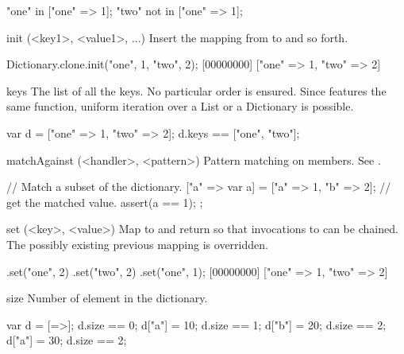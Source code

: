 \begin{urbiscriptapi}
\begin{urbiassert}
"one" in     ["one" => 1];
"two" not in ["one" => 1];
\end{urbiassert}


\item[init](<key1>, <value1>, ...)%
  Insert the mapping from  to  and so forth.

\begin{urbiscript}
Dictionary.clone.init("one", 1, "two", 2);
[00000000] ["one" => 1, "two" => 2]
\end{urbiscript}


\item[keys]%
  The list of all the keys.  No particular order is ensured.  Since
   features the same function, uniform iteration over
  a List or a Dictionary is possible.
\begin{urbiassert}
var d = ["one" => 1, "two" => 2];
d.keys == ["one", "two"];
\end{urbiassert}


\item[matchAgainst](<handler>, <pattern>)
  Pattern matching on members.  See .

\begin{urbiscript}
{
  // Match a subset of the dictionary.
  ["a" => var a] = ["a" => 1, "b" => 2];
  // get the matched value.
  assert(a == 1);
};
\end{urbiscript}


\item[set](<key>, <value>)%
  Map  to  and return \this so that invocations to
   can be chained.  The possibly existing previous mapping is
  overridden.

\begin{urbiscript}
[=>].set("one", 2)
    .set("two", 2)
    .set("one", 1);
[00000000] ["one" => 1, "two" => 2]
\end{urbiscript}


\item[size]
  Number of element in the dictionary.

\begin{urbiassert}
var d = [=>];  d.size == 0;
d["a"] = 10;   d.size == 1;
d["b"] = 20;   d.size == 2;
d["a"] = 30;   d.size == 2;
\end{urbiassert}
\end{urbiscriptapi}


